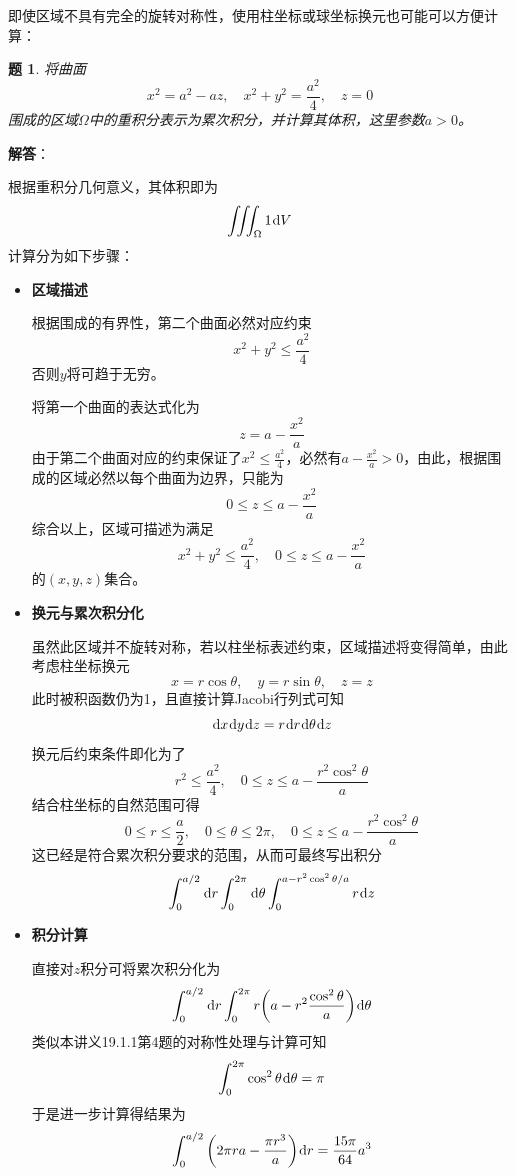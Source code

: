 \documentclass[a4paper,UTF8,fontset=windows,AutoFakeBold]{ctexart}
\newcommand*{\dr}{\hspace{0.07em}\mathrm{d}}
\theoremstyle{ex}
\newtheorem{exercise}{题}
\newcommand{\sol}[1]{{\vspace{5pt}\kaishu\noindent\textbf{解答}：\vspace{-3pt}
\begin{compactitem}
    \item[] #1
\end{compactitem}
}}
\begin{document}
即使区域不具有完全的旋转对称性，使用柱坐标或球坐标换元也可能可以方便计算：
\begin{framed}
\begin{exercise}
    将曲面
    $$x^2=a^2-az,\quad x^2+y^2=\frac{a^2}{4},\quad z=0$$
    围成的区域$\Omega$中的重积分表示为累次积分，并计算其体积，这里参数$a>0$。
\end{exercise}
\sol{
    根据重积分几何意义，其体积即为
    $$\iiint_\Omega1\dr V$$
    计算分为如下步骤：
    \begin{itemize}
        \item \textbf{区域描述}
        
        根据围成的有界性，第二个曲面必然对应约束
        $$x^2+y^2\le\frac{a^2}{4}$$
        否则$y$将可趋于无穷。
        
        将第一个曲面的表达式化为
        $$z=a-\frac{x^2}{a}$$
        由于第二个曲面对应的约束保证了$x^2\le\frac{a^2}{4}$，必然有$a-\frac{x^2}{a}>0$，由此，根据围成的区域必然以每个曲面为边界，只能为
        $$0\le z\le a-\frac{x^2}{a}$$
        综合以上，区域可描述为满足
        $$x^2+y^2\le\frac{a^2}{4},\quad0\le z\le a-\frac{x^2}{a}$$
        的$(x,y,z)$集合。

        \item \textbf{换元与累次积分化}
        
        虽然此区域并不旋转对称，若以柱坐标表述约束，区域描述将变得简单，由此考虑柱坐标换元
        $$x=r\cos\theta,\quad y=r\sin\theta,\quad z=z$$
        此时被积函数仍为1，且直接计算Jacobi行列式可知
        $$\dr x\dr y\dr z=r\dr r\dr\theta\dr z$$
        换元后约束条件即化为了
        $$r^2\le\frac{a^2}{4},\quad 0\le z\le a-\frac{r^2\cos^2\theta}{a}$$
        结合柱坐标的自然范围可得
        $$0\le r\le\frac{a}{2},\quad0\le\theta\le 2\pi,\quad 0\le z\le a-\frac{r^2\cos^2\theta}{a}$$
        这已经是符合累次积分要求的范围，从而可最终写出积分
        $$\int_0^{a/2}\dr r\int_0^{2\pi}\dr\theta\int_0^{a-r^2\cos^2\theta/a}r\dr z$$        

        \item \textbf{积分计算}
        
        直接对$z$积分可将累次积分化为
        $$\int_0^{a/2}\dr r\int_0^{2\pi}r\bigg(a-r^2\frac{\cos^2\theta}{a}\bigg)\dr\theta$$
        类似本讲义19.1.1第4题的对称性处理与计算可知
        $$\int_0^{2\pi}\cos^2\theta\dr\theta=\pi$$
        于是进一步计算得结果为
        $$\int_0^{a/2}\bigg(2\pi ra-\frac{\pi r^3}{a}\bigg)\dr r=\frac{15\pi}{64}a^3$$
    \end{itemize}
}
\end{framed}
\end{document}
